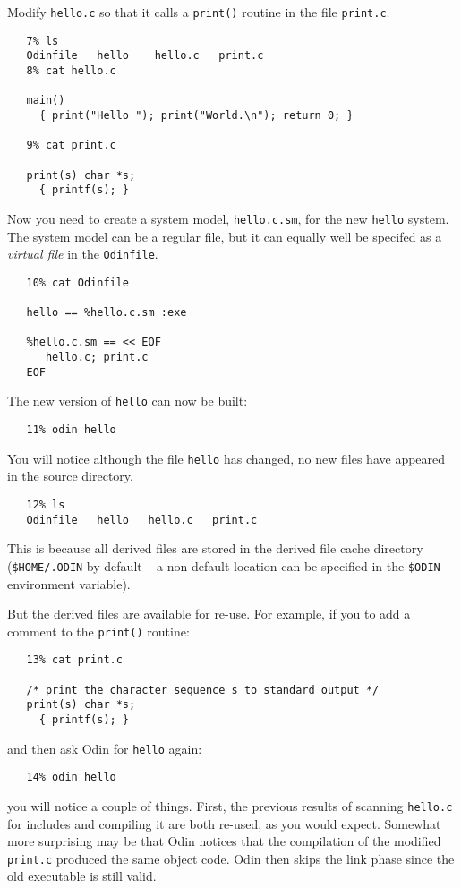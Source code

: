 \documentclass[hidelinks]{report}
\newcommand{\ex}{\tt}   %
\begin{document}
Modify {\ex hello.c} so that it calls a {\ex print()}
routine in the file {\ex print.c}.
\begin{verbatim}
   7% ls
   Odinfile   hello    hello.c   print.c
   8% cat hello.c

   main()
     { print("Hello "); print("World.\n"); return 0; }

   9% cat print.c

   print(s) char *s;
     { printf(s); }
\end{verbatim}
Now you need to create a system model, {\ex hello.c.sm},
for the new {\ex hello} system.
The system model can be a regular file,
but it can equally well be specifed as a {\em virtual file}
in the {\ex Odinfile}.
\begin{verbatim}
   10% cat Odinfile

   hello == %hello.c.sm :exe

   %hello.c.sm == << EOF
      hello.c; print.c
   EOF
\end{verbatim}
The new version of {\ex hello} can now be built:
\begin{verbatim}
   11% odin hello
\end{verbatim}
You will notice although the file {\ex hello} has changed,
no new files have appeared in the source directory.
\begin{verbatim}
   12% ls
   Odinfile   hello   hello.c   print.c
\end{verbatim}
This is because all derived files are stored in the derived file cache
directory ({\ex \$HOME/.ODIN} by default -- a non-default location can be
specified in the {\ex \$ODIN} environment variable).

But the derived files are available for re-use.  For example, if you
to add a comment to the {\ex print()} routine:
\begin{verbatim}
   13% cat print.c

   /* print the character sequence s to standard output */
   print(s) char *s;
     { printf(s); }
\end{verbatim}
and then ask Odin for {\ex hello} again:
\begin{verbatim}
   14% odin hello
\end{verbatim}
you will notice a couple of things.
First, the previous results of scanning {\ex hello.c} for includes
and compiling it are both re-used, as you would expect.
Somewhat more surprising may be that Odin notices that the compilation of
the modified {\ex print.c} produced the same object code.
Odin then skips the link
phase since the old executable is still valid.
\end{document}
